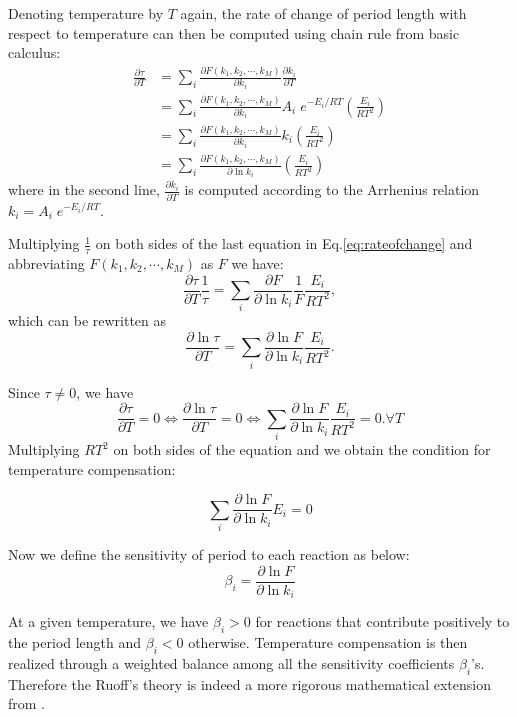 \documentclass[a4paper,10pt]{article}
\numberwithin{equation}{section}
\begin{document}
Denoting temperature by $T$ again, the rate of change of period length with respect to temperature can then be computed using chain rule from  basic calculus:
\begin{equation}
\begin{split}\label{eq:rateofchange}
\frac{\partial \tau}{\partial T} &= \sum_i \frac{\partial F(k_1,k_2,\cdots ,k_M)}{\partial k_i} \frac{\partial k_i}{\partial T}\\
&=\sum_i \frac{\partial F(k_1,k_2,\cdots ,k_M)}{\partial k_i} A_i\;e^{-E_i/RT}(\frac{E_i}{RT^2})\\
&=\sum_i \frac{\partial F(k_1,k_2,\cdots ,k_M)}{\partial k_i} k_i (\frac{E_i}{RT^2})\\
&=\sum_i \frac{\partial F(k_1,k_2,\cdots ,k_M)}{\partial \ln k_i}  (\frac{E_i}{RT^2})
\end{split}
\end{equation}
where in the second line, $\frac{\partial k_i}{\partial T}$ is computed according to the Arrhenius relation $k_i=A_i\; e^{-E_i/RT}$.

Multiplying $\frac{1}{\tau}$ on both sides of the last equation in Eq.\ref{eq:rateofchange} and abbreviating $F(k_1,k_2,\cdots ,k_M)$ as $F$ we have:
\begin{equation*}
\frac{\partial \tau}{\partial T}\frac{1}{\tau}= \sum_i \frac{\partial F}{\partial \ln k_i} \frac{1}{F}  \frac{E_i}{RT^2}, 
\end{equation*}
which can be rewritten as
\begin{equation}\label{eq:integral}
\frac{\partial \ln \tau}{\partial T}= \sum_i \frac{\partial \ln F}{\partial \ln k_i} \frac{E_i}{RT^2}. 
\end{equation}

Since $\tau\neq 0$, we have
\[ \frac{\partial \tau}{\partial T} =0 \iff \frac{\partial \ln \tau}{\partial T}=0 \iff \sum_i \frac{\partial \ln F}{\partial \ln k_i} \frac{E_i}{RT^2}=0. \forall T\] 
Multiplying $RT^2$ on both sides of the equation and we obtain the  condition for temperature compensation:

\begin{equation}\label{eq:balance}
\sum_i \frac{\partial \ln  F}{\partial \ln k_i} E_i = 0
\end{equation}

Now we define the sensitivity of period to each reaction as below:
\[ \beta_i=\frac{\partial \ln  F}{\partial \ln k_i}\]

At a given temperature, we have $\beta_i>0$  for reactions that contribute positively to the period length and $\beta_i< 0$ otherwise. Temperature compensation is then realized through a weighted balance among all the sensitivity coefficients $\beta_i$'s. Therefore the Ruoff's theory is indeed  a more rigorous mathematical extension from \citet{hastings1957}. 
\end{document}
